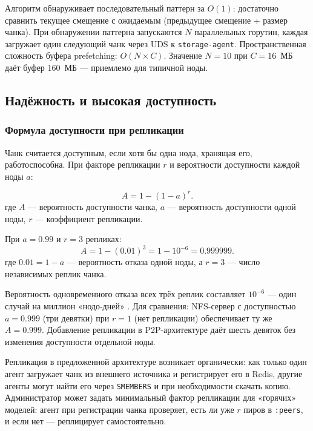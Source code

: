 Алгоритм обнаруживает последовательный паттерн за $O(1)$: достаточно сравнить текущее смещение с ожидаемым (предыдущее смещение + размер чанка). При обнаружении паттерна запускаются $N$ параллельных горутин, каждая загружает один следующий чанк через UDS к \texttt{storage-agent}. Пространственная сложность буфера prefetching: $O(N \times C)$. Значение $N = 10$ при $C = 16$~МБ даёт буфер 160~МБ --- приемлемо для типичной ноды.

\subsection{Надёжность и высокая доступность}

\subsubsection{Формула доступности при репликации}

Чанк считается доступным, если хотя бы одна нода, хранящая его, работоспособна. При факторе репликации $r$ и вероятности доступности каждой ноды $a$:

\begin{equation}
A = 1 - (1 - a)^r.
\label{eq:availability}
\end{equation}
где $A$ --- вероятность доступности чанка, $a$ --- вероятность доступности одной ноды, $r$ --- коэффициент репликации.

При $a = 0.99$ и $r = 3$ репликах:
\begin{equation}
A = 1 - (0.01)^3 = 1 - 10^{-6} = 0.999999.
\end{equation}
где $0.01 = 1 - a$ --- вероятность отказа одной ноды, а $r = 3$ --- число независимых реплик чанка.

Вероятность одновременного отказа всех трёх реплик составляет $10^{-6}$ --- один случай на миллион «нодо-дней» \cite{ford2010availability}. Для сравнения: NFS-сервер с доступностью $a = 0.999$ (три девятки) при $r = 1$ (нет репликации) обеспечивает ту же $A = 0.999$. Добавление репликации в P2P-архитектуре даёт шесть девяток без изменения доступности отдельной ноды.

Репликация в предложенной архитектуре возникает органически: как только один агент загружает чанк из внешнего источника и регистрирует его в Redis, другие агенты могут найти его через \texttt{SMEMBERS} и при необходимости скачать копию. Администратор может задать минимальный фактор репликации для «горячих» моделей: агент при регистрации чанка проверяет, есть ли уже $r$ пиров в \texttt{:peers}, и если нет --- реплицирует самостоятельно.

